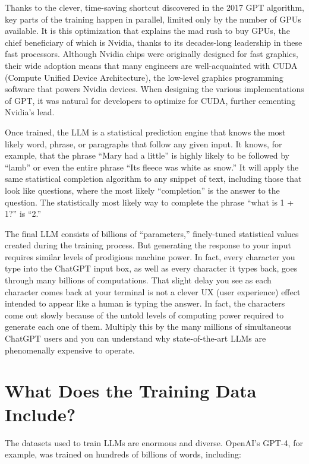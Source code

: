 \documentclass[
  Letterpaper,
]{scrbook}
\begin{document}
Thanks to the clever, time-saving shortcut discovered in the 2017 GPT
algorithm, key parts of the training happen in parallel, limited only by
the number of GPUs available. It is this optimization that explains the
mad rush to buy GPUs, the chief beneficiary of which is Nvidia, thanks
to its decades-long leadership in these fast processors. Although Nvidia
chips were originally designed for fast graphics, their wide adoption
means that many engineers are well-acquainted with CUDA (Compute Unified
Device Architecture), the low-level graphics programming software that
powers Nvidia devices. When designing the various implementations of
GPT, it was natural for developers to optimize for CUDA, further
cementing Nvidia's lead.

Once trained, the LLM is a statistical prediction engine that knows the
most likely word, phrase, or paragraphs that follow any given input. It
knows, for example, that the phrase ``Mary had a little'' is highly
likely to be followed by ``lamb'' or even the entire phrase ``Its fleece
was white as snow.'' It will apply the same statistical completion
algorithm to any snippet of text, including those that look like
questions, where the most likely ``completion'' is the answer to the
question. The statistically most likely way to complete the phrase
``what is 1 + 1?'' is ``2.''

The final LLM consists of billions of
``parameters,'' finely-tuned statistical
values created during the training process. But generating the response
to your input requires similar levels of prodigious machine power. In
fact, every character you type into the ChatGPT input box, as well as
every character it types back, goes through many billions of
computations. That slight delay you see as each character comes back at
your terminal is not a clever UX (user experience) effect intended to
appear like a human is typing the answer. In fact, the characters come
out slowly because of the untold levels of computing power required to
generate each one of them. Multiply this by the many millions of
simultaneous ChatGPT users and you can understand why state-of-the-art
LLMs are phenomenally expensive to operate.

\section{What Does the Training Data
Include?}\label{what-does-the-training-data-include}

The datasets used to train LLMs are enormous and diverse. OpenAI's
GPT-4, for example, was trained on hundreds of billions of words,
including:
\end{document}

